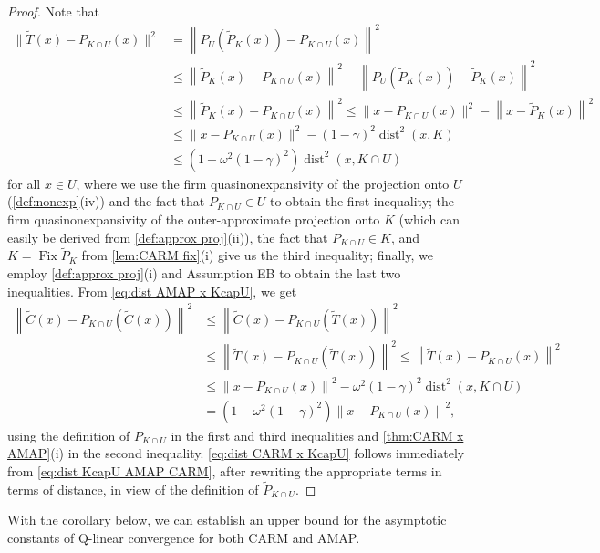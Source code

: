 \documentclass[smallextended,numbook,nospthms]{svjour3}
\theoremstyle{plain}
\theoremstyle{definition}
\DeclareMathOperator{\Fix}{Fix}
\DeclareMathOperator{\dist}{dist}
\begin{document}
\begin{proof}
    Note that
	\begin{align}
		\|\tilde{T}(x)-P_{K \cap U}(x)\|^{2} &=\left\|P_{U}\left(\tilde{P}_{K}(x)\right)-P_{K \cap U}(x)\right\|^{2} \\
		&\leq \left\|\tilde{P}_{K}(x)-P_{K \cap U}(x)\right\|^{2}-\left\|P_{U}\left(\tilde{P}_{K}(x)\right)-\tilde{P}_{K}(x)\right\|^{2} \\ &\leq\left\|\tilde{P}_{K}(x)-P_{K \cap U}(x)\right\|^{2} \leq\|x-P_{K \cap U}(x)\|^{2}-\left\|x-\tilde{P}_{K}(x)\right\|^{2} \\
		&\leq \|x-P_{K \cap U}(x)\|^{2}-(1-\gamma)^2\dist^{2}(x, K) \\ &\leq (1-\omega^{2}(1-\gamma)^{2}) \dist^{2}(x, K \cap U) \label{eq:dist AMAP x KcapU}
	\end{align}
	for all $x \in U$,  where we use the firm quasinonexpansivity of the projection onto $U$ (\cref{def:nonexp}(iv)) and the fact that $P_{K \cap U} \in U$ to obtain the first inequality; the
	firm quasinonexpansivity of the outer-approximate projection onto $K$ (which can easily be derived from \cref{def:approx proj}(ii)), the fact that $P_{K \cap U} \in K$, and  $K = \Fix \tilde{P}_{K}$ from \cref{lem:CARM fix}(i) give us the third inequality; finally, we employ \cref{def:approx proj}(i) and Assumption EB to obtain the last two inequalities. From \cref{eq:dist AMAP x KcapU}, we get
	\begin{align}
		\left\|\tilde{C}(x)-P_{K \cap U}(\tilde{C}(x))\right\|^{2} & \leq\left\|\tilde{C}(x)-P_{K \cap U}(\tilde{T}(x))\right\|^{2}  \\
		& \leq\left\|\tilde{T}(x)-P_{K \cap U}(\tilde{T}(x))\right\|^{2} \leq\left\|\tilde{T}(x)-P_{K \cap U}(x)\right\|^{2}  \\
		& \leq\left\|x-P_{K \cap U}(x)\right\|^{2}-\omega^{2}(1-\gamma)^{2} \dist^{2}(x, K \cap U)  \\
		&=\left(1-\omega^{2}(1-\gamma)^{2}\right)\left\|x-P_{K \cap U}(x)\right\|^{2},\label{eq:dist CARM x KcapU}
	\end{align}
	using the definition of $P_{K \cap U}$ in the first and third inequalities and \cref{thm:CARM x AMAP}(i) in the second inequality. \cref{eq:dist CARM x KcapU} follows immediately from \cref{eq:dist KcapU AMAP CARM}, after rewriting the appropriate terms in terms of distance, in view of the definition of $\tilde{P}_{K \cap U}$.
	\end{proof}
With the corollary below, we can establish an upper bound for the asymptotic constants of Q-linear convergence for both CARM and AMAP.
\end{document}
